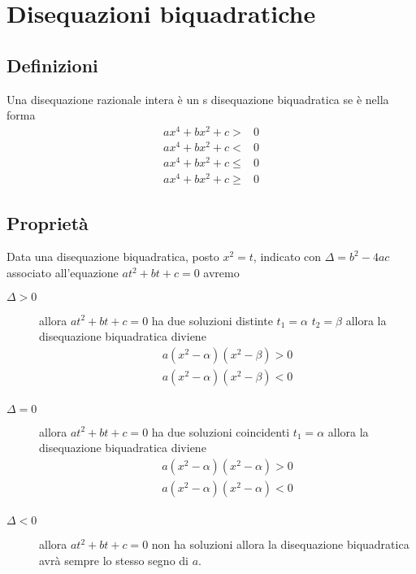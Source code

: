 \chapter{Disequazioni biquadratiche}
\section{Definizioni}
\begin{defn}
Una disequazione razionale intera è un s disequazione biquadratica se è nella forma
\begin{align*}
	ax^4+bx^2+c>&0\\
	ax^4+bx^2+c<&0\\
	ax^4+bx^2+c\leq&0\\
	ax^4+bx^2+c\geq&0
\end{align*}
\end{defn}
\section{Proprietà}
\begin{thm}
	Data una disequazione biquadratica, posto $x^2=t$, indicato con $\Delta=b^2-4ac$  associato all'equazione $at^2+bt+c=0$ avremo
	\begin{description}
		\item[$\Delta>0$] allora $at^2+bt+c=0$ ha due soluzioni distinte $t_1=\alpha$ $t_2=\beta$ allora la disequazione biquadratica diviene \begin{align*}
			a(x^2-\alpha)(x^2-\beta)>0\\a(x^2-\alpha)(x^2-\beta)<0\\
		\end{align*}
			\item[$\Delta=0$] allora $at^2+bt+c=0$ ha due soluzioni coincidenti $t_1=\alpha$ allora la disequazione biquadratica diviene \begin{align*}
		a(x^2-\alpha)(x^2-\alpha)>0\\a(x^2-\alpha)(x^2-\alpha)<0\\
		\end{align*}
			\item[$\Delta<0$] allora $at^2+bt+c=0$ non ha  soluzioni  allora la disequazione biquadratica avrà sempre lo stesso segno di $a$.
	\end{description}
\end{thm}